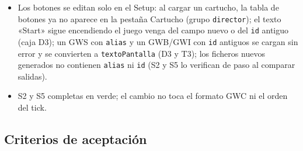 \begin{itemize}
	\item Los botones se editan solo en el Setup: al cargar un cartucho, la tabla de botones ya no aparece en la pestaña Cartucho (grupo \texttt{director}); el texto «Start» sigue encendiendo el juego venga del campo nuevo o del \texttt{id} antiguo (caja D3); un GWS con \texttt{alias} y un GWB/GWI con \texttt{id} antiguos se cargan sin error y se convierten a \texttt{textoPantalla} (D3 y T3); los ficheros nuevos generados no contienen \texttt{alias} ni \texttt{id} (S2 y S5 lo verifican de paso al comparar salidas).
	\item S2 y S5 completas en verde; el cambio no toca el formato GWC ni el orden del tick.
\end{itemize}

\subsection{Criterios de aceptación}
\label{sec:F5I21Criterios}

